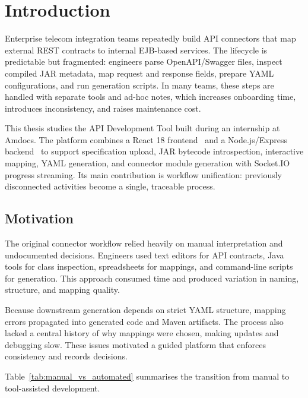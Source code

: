 \chapter{Introduction}

Enterprise telecom integration teams repeatedly build API connectors that map external REST contracts to internal EJB-based services. The lifecycle is predictable but fragmented: engineers parse OpenAPI/Swagger files, inspect compiled JAR metadata, map request and response fields, prepare YAML configurations, and run generation scripts. In many teams, these steps are handled with separate tools and ad-hoc notes, which increases onboarding time, introduces inconsistency, and raises maintenance cost.

This thesis studies the API Development Tool built during an internship at Amdocs. The platform combines a React 18 frontend~\cite{react_docs} and a Node.js/Express backend~\cite{express_docs} to support specification upload, JAR bytecode introspection, interactive mapping, YAML generation, and connector module generation with Socket.IO~\cite{socketio_docs} progress streaming. Its main contribution is workflow unification: previously disconnected activities become a single, traceable process.

\section{Motivation}

The original connector workflow relied heavily on manual interpretation and undocumented decisions. Engineers used text editors for API contracts, Java tools for class inspection, spreadsheets for mappings, and command-line scripts for generation. This approach consumed time and produced variation in naming, structure, and mapping quality.

Because downstream generation depends on strict YAML structure, mapping errors propagated into generated code and Maven artifacts. The process also lacked a central history of why mappings were chosen, making updates and debugging slow. These issues motivated a guided platform that enforces consistency and records decisions.

Table~\ref{tab:manual_vs_automated} summarises the transition from manual to tool-assisted development.

